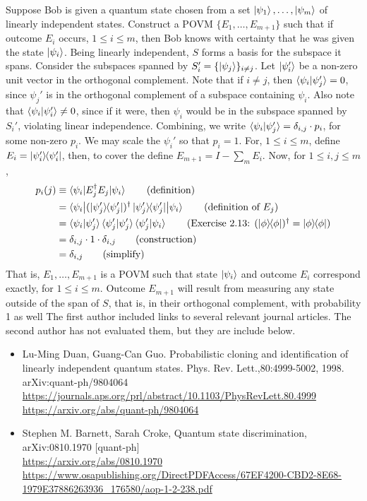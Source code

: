  Suppose Bob is given a quantum state chosen from a set $\ket{\psi_1}, \ldots, \ket{\psi_m}$ of linearly independent states.  Construct a POVM $\{E_1, \ldots, E_{m+1}\}$ such that if outcome $E_i$ occurs, $1 \leq i \leq m$, then Bob knows with certainty that he was given the state $\ket{\psi_i}$.
\Soln Being linearly independent, $S$ forms a basis for the subspace it spans. Consider the subspaces spanned by $S_i' = \{\ket{\psi_j}\}_{i\neq j}$.  Let $\ket{\psi_i'}$ be a non-zero unit vector in the orthogonal complement.  Note that if $i\neq j$, then $\braket{\psi_i|\psi_j'} = 0$, since $\psi_j'$ is in the orthogonal complement of a subspace containing $\psi_i$.  Also note that $\braket{\psi_i | \psi_i'} \neq 0$, since if it were, then $\psi_i$ would be in the subspace spanned by $S_i'$, violating linear independence.   Combining, we write $\braket{\psi_i|\psi_j'} = \delta_{i,j}\cdot p_i$, for some non-zero $p_i$.  We may scale the $\psi_i'$ so that $ p_i = 1$.  For, $1\leq i\leq m$, define $E_i = \ket{\psi_i'}\hspace{-1mm} \bra{\psi_i'}$, then, to cover the  define $E_{m+1} = I-\sum_m E_i$.  Now, for $1\leq i,j\leq m$,
\begin{align*}
p_i(j) &\equiv \braket{\psi_i|E_j^\dagger E_j|\psi_i} \tag{definition} \\
    &= \braket{\psi_i\bigl\lvert (\kb{\psi_j'})^\dagger \kb{\psi_j'}\bigr\rvert \psi_i} \tag{definition of $E_j$}\\
    &= \braket{\psi_i|\psi_j'}\braket{\psi_j'|\psi_j'}\braket{\psi_j'|\psi_i} \tag{Exercise 2.13: $(\kb{\phi})^\dagger=\kb{\phi}$} \\
    &= \delta_{i,j}\cdot 1\cdot \delta_{i,j} \tag{construction}\\
    &= \delta_{i,j} \tag{simplify}
\end{align*}
That is, $E_1,\ldots , E_{m+1}$ is a  POVM such that state $\ket{\psi_i}$ and outcome $E_i$ correspond exactly, for $1\leq i\leq m$.  Outcome $E_{m+1}$ will result from measuring any state outside of the span of $S$, that is, in their orthogonal complement, with probability 1 as well
The first author included links to several relevant journal articles.  The second author has not evaluated them, but they are include below.
\begin{itemize}
    \item Lu-Ming Duan, Guang-Can Guo.  Probabilistic cloning and identification of linearly independent quantum states. Phys. Rev. Lett.,80:4999-5002, 1998. arXiv:quant-ph/9804064\\
    \url{https://journals.aps.org/prl/abstract/10.1103/PhysRevLett.80.4999}\\
    \url{https://arxiv.org/abs/quant-ph/9804064}
%
    \item Stephen M. Barnett, Sarah Croke, Quantum state discrimination, arXiv:0810.1970 [quant-ph]\\
    \url{https://arxiv.org/abs/0810.1970}\\
    \url{https://www.osapublishing.org/DirectPDFAccess/67EF4200-CBD2-8E68-1979E37886263936_176580/aop-1-2-238.pdf}
\end{itemize}
